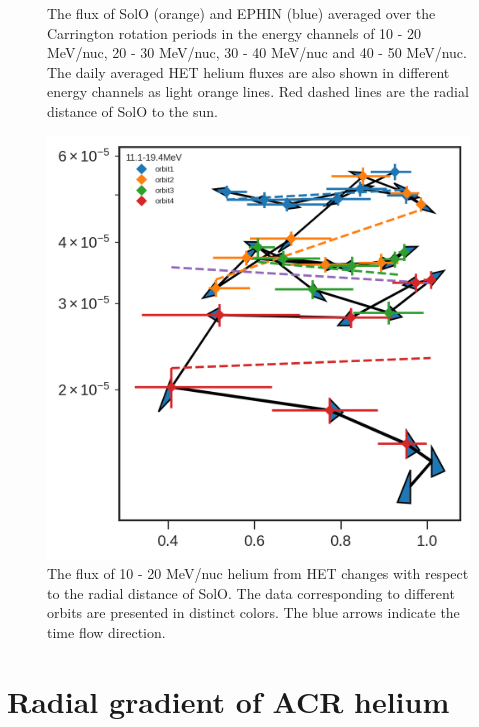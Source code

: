 \begin{figure}
    \caption[The averaged helium flux in four energy channels between 10 and 50 MeV/nuc]{The flux of \ac{SolO} (orange) and \ac{EPHIN} (blue) averaged over the Carrington rotation periods in the energy channels of 10 - 20 MeV/nuc, 20 - 30 MeV/nuc, 30 - 40 MeV/nuc and 40 - 50 MeV/nuc. The daily averaged \ac{HET} helium fluxes are also shown in different energy channels as light orange lines. Red dashed lines are the radial distance of \ac{SolO} to the sun.}
    \label{fig:carrington_flux}
\end{figure}

\begin{figure}
    \centering
    \includegraphics{images/ACR/SOLO-flux_only.png}
    \caption[10 - 20 MeV/nuc \ac{HET} helium flux vs the radial distance of \ac{SolO}]{The flux of 10 - 20 MeV/nuc helium from \ac{HET} changes with respect to the radial distance of \ac{SolO}. The data corresponding to different orbits are presented in distinct colors. The blue arrows indicate the time flow direction.}
    \label{fig:fluxvsdistance}  
\end{figure}


\section{Radial gradient of ACR helium}

